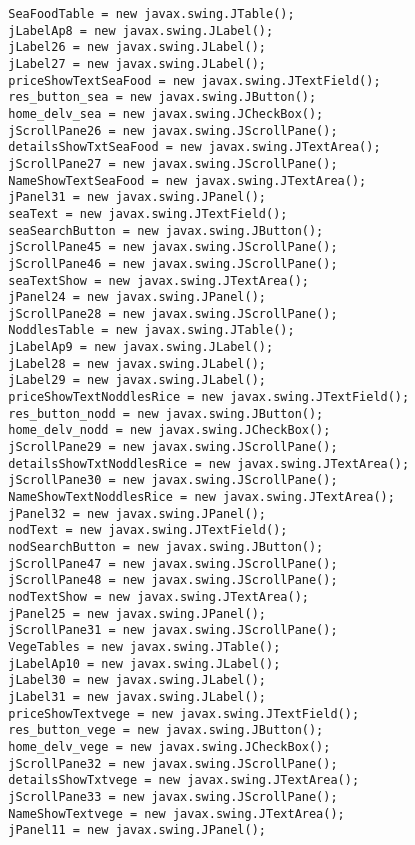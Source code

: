 \documentclass[12pt,a4paper]{article}
\begin{document}
\begin{lstlisting}
        SeaFoodTable = new javax.swing.JTable();
        jLabelAp8 = new javax.swing.JLabel();
        jLabel26 = new javax.swing.JLabel();
        jLabel27 = new javax.swing.JLabel();
        priceShowTextSeaFood = new javax.swing.JTextField();
        res_button_sea = new javax.swing.JButton();
        home_delv_sea = new javax.swing.JCheckBox();
        jScrollPane26 = new javax.swing.JScrollPane();
        detailsShowTxtSeaFood = new javax.swing.JTextArea();
        jScrollPane27 = new javax.swing.JScrollPane();
        NameShowTextSeaFood = new javax.swing.JTextArea();
        jPanel31 = new javax.swing.JPanel();
        seaText = new javax.swing.JTextField();
        seaSearchButton = new javax.swing.JButton();
        jScrollPane45 = new javax.swing.JScrollPane();
        jScrollPane46 = new javax.swing.JScrollPane();
        seaTextShow = new javax.swing.JTextArea();
        jPanel24 = new javax.swing.JPanel();
        jScrollPane28 = new javax.swing.JScrollPane();
        NoddlesTable = new javax.swing.JTable();
        jLabelAp9 = new javax.swing.JLabel();
        jLabel28 = new javax.swing.JLabel();
        jLabel29 = new javax.swing.JLabel();
        priceShowTextNoddlesRice = new javax.swing.JTextField();
        res_button_nodd = new javax.swing.JButton();
        home_delv_nodd = new javax.swing.JCheckBox();
        jScrollPane29 = new javax.swing.JScrollPane();
        detailsShowTxtNoddlesRice = new javax.swing.JTextArea();
        jScrollPane30 = new javax.swing.JScrollPane();
        NameShowTextNoddlesRice = new javax.swing.JTextArea();
        jPanel32 = new javax.swing.JPanel();
        nodText = new javax.swing.JTextField();
        nodSearchButton = new javax.swing.JButton();
        jScrollPane47 = new javax.swing.JScrollPane();
        jScrollPane48 = new javax.swing.JScrollPane();
        nodTextShow = new javax.swing.JTextArea();
        jPanel25 = new javax.swing.JPanel();
        jScrollPane31 = new javax.swing.JScrollPane();
        VegeTables = new javax.swing.JTable();
        jLabelAp10 = new javax.swing.JLabel();
        jLabel30 = new javax.swing.JLabel();
        jLabel31 = new javax.swing.JLabel();
        priceShowTextvege = new javax.swing.JTextField();
        res_button_vege = new javax.swing.JButton();
        home_delv_vege = new javax.swing.JCheckBox();
        jScrollPane32 = new javax.swing.JScrollPane();
        detailsShowTxtvege = new javax.swing.JTextArea();
        jScrollPane33 = new javax.swing.JScrollPane();
        NameShowTextvege = new javax.swing.JTextArea();
        jPanel11 = new javax.swing.JPanel();

\end{lstlisting}
\end{document}
